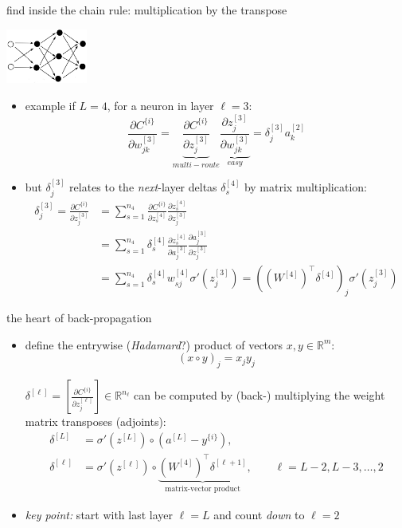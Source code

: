 \documentclass[xcolor={svgnames},
               hyperref={colorlinks,citecolor=DeepPink4,linkcolor=FireBrick,urlcolor=Maroon}]
               {beamer}
\newcommand{\RR}{\mathbb{R}}
\begin{document}
\begin{frame}{find inside the chain rule: multiplication by the transpose}

\hfill \includegraphics[width=0.2\textwidth]{figs/cleannet}

\vspace{-15mm}
\begin{itemize}
\item example if $L=4$, for a neuron in layer $\ell=3$:
   $$\frac{\partial C^{\{i\}}}{\partial w_{jk}^{[3]}} = \underbrace{\frac{\partial C^{\{i\}}}{\partial z_{j}^{[3]}}}_{multi-route} \underbrace{\frac{\partial z_{j}^{[3]}}{\partial w_{jk}^{[3]}}}_{easy} = \delta_j^{[3]} a_{k}^{[2]}$$
\item but $\delta_j^{[3]}$ relates to the \emph{next}-layer deltas $\delta_s^{[4]}$ by matrix multiplication:
\begin{align*}
\delta_j^{[3]} = \frac{\partial C^{\{i\}}}{\partial z_{j}^{[3]}} &= \sum_{s=1}^{n_4} \frac{\partial C^{\{i\}}}{\partial z_{s}^{[4]}} \frac{\partial z_{s}^{[4]}}{\partial z_{j}^{[3]}} \\
  &= \sum_{s=1}^{n_4} \delta_s^{[4]} \frac{\partial z_{s}^{[4]}}{\partial a_{j}^{[3]}} \frac{\partial a_{j}^{[3]}}{\partial z_{j}^{[3]}} \\
  &= \sum_{s=1}^{n_4} \delta_s^{[4]} w_{sj}^{[4]} \sigma'(z_{j}^{[3]}) = \left((W^{[4]})^\top \delta^{[4]}\right)_j \sigma'(z_{j}^{[3]})
\end{align*}
\end{itemize}
\end{frame}


\begin{frame}{the heart of back-propagation}

\begin{itemize}
\item define the entrywise (\emph{Hadamard}?) product of vectors $x,y\in\RR^m$:
    $$(x\circ y)_j = x_j y_j$$

\begin{lemma}
$\displaystyle \delta^{[\ell]} = \left[\frac{\partial C^{\{i\}}}{\partial z_j^{[\ell]}}\right]  \in \RR^{n_{\ell}}$ can be computed by (back-) multiplying the weight matrix transposes (adjoints):
\begin{align*}
\delta^{[L]} &= \sigma'(z^{[L]}) \circ (a^{[L]} - y^{\{i\}}), \\
\delta^{[\ell]} &= \sigma'(z^{[\ell]}) \circ \underbrace{(W^{[4]})^\top \delta^{[\ell+1]}}_{\text{matrix-vector product}}, \qquad \ell = L-2,L-3,\dots,2
\end{align*}
\end{lemma}

\bigskip
\item \emph{key point:} start with last layer $\ell=L$ and count \emph{down} to $\ell=2$
\end{itemize}
\end{frame}
\end{document}
